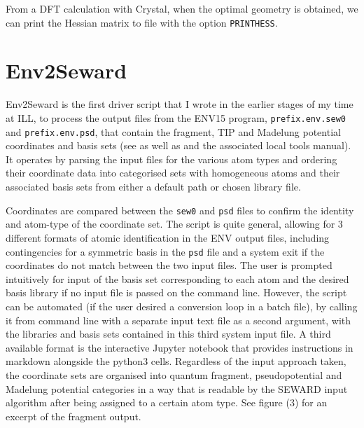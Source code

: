 \documentclass[10pt]{article}
\begin{document}
From a DFT calculation with Crystal, when the optimal geometry is obtained, we can print the Hessian matrix to file with the option \verb|PRINTHESS|. 




\section{Env2Seward}
Env2Seward is the first driver script that I wrote in the earlier stages of my time at ILL, to process the output files from the ENV15 program, \texttt{prefix.env.sew0} and \texttt{prefix.env.psd}, that contain the fragment, TIP and Madelung potential coordinates and basis sets (see \cite{varignon2013ab} as well as \cite{gelle2008fast} and the associated local tools manual). It operates by parsing the input files for the various atom types and ordering their coordinate data into categorised sets with homogeneous atoms and their associated basis sets from either a default path or chosen library file.

Coordinates are compared between the \texttt{sew0} and \texttt{psd} files to confirm the identity and atom-type of the coordinate set. The script is quite general, allowing for 3 different formats of atomic identification in the ENV output files, including contingencies for a symmetric basis in the \texttt{psd} file and a system exit if the coordinates do not match between the two input files. The user is prompted intuitively for input of the basis set corresponding to each atom and the desired basis library if no input file is passed on the command line. However, the script can be automated (if the user desired a conversion loop in a batch file), by calling it from command line with a separate input text file as a second argument, with the libraries and basis sets contained in this third system input file. A third available format is the interactive Jupyter notebook that provides instructions in markdown alongside the python3 cells. Regardless of the input approach taken, the coordinate sets are organised into quantum fragment, pseudopotential and Madelung potential categories in a way that is readable by the SEWARD input algorithm after being assigned to a certain atom type. See figure (3) for an excerpt of the fragment output.
\end{document}
